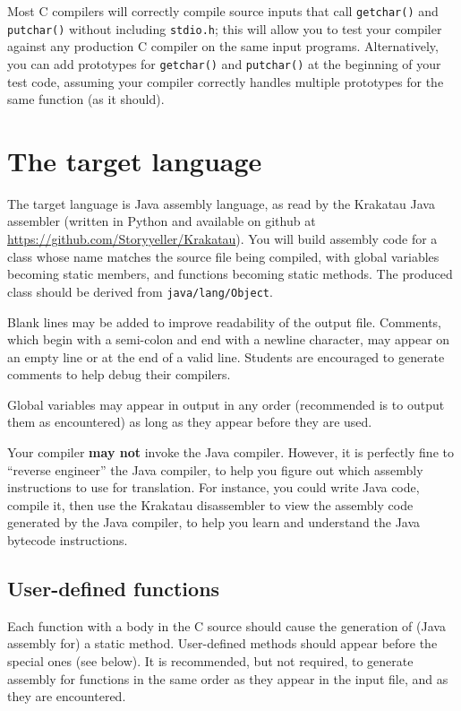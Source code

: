 \documentclass{article}
\begin{document}
Most C compilers will correctly compile source inputs
that call {\tt getchar()} and {\tt putchar()}
without including {\tt stdio.h};
this will allow you to test your compiler against any production C compiler
on the same input programs.
Alternatively,
you can add prototypes for {\tt getchar()} and {\tt putchar()}
at the beginning of your test code,
assuming your compiler correctly handles
multiple prototypes for the same function (as it should).

\section{The target language} \label{SEC:target}

The target language is Java assembly language,
as read by the Krakatau Java assembler
(written in Python and available on github at
\url{https://github.com/Storyyeller/Krakatau}).
You will build assembly code for a class whose name
matches the source file being compiled,
with global variables becoming static members,
and functions becoming static methods.
The produced class should be derived from {\tt java/lang/Object}.

Blank lines may be added to improve readability of the output file.
Comments,
which begin with a semi-colon and end with a newline character,
may appear on an empty line or at the end of a valid line.
Students are encouraged to generate comments to help debug their compilers.

Global variables may appear in output in any order
(recommended is to output them as encountered)
as long as they appear before they are used.

Your compiler {\bf may not} invoke the Java compiler.
However, it is perfectly fine to ``reverse engineer'' the Java compiler,
to help you figure out which assembly instructions to use for translation.
For instance, you could write Java code, compile it, then use the Krakatau
disassembler to view the assembly code generated by the Java compiler,
to help you learn and understand the Java bytecode instructions.

\subsection{User-defined functions}

Each function with a body in the C source
should cause the generation of (Java assembly for)
a static method.
User-defined methods should appear before the special ones (see below).
It is recommended, but not required,
to generate assembly for functions in the same order as
they appear in the input file,
and as they are encountered.
\end{document}
